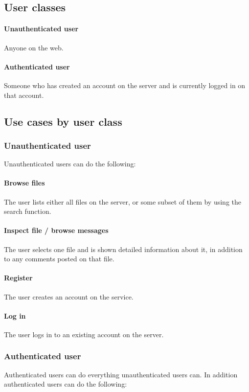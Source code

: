 \documentclass[10pt,a4paper]{article}
\begin{document}
\subsection{User classes}
\paragraph{Unauthenticated user}
Anyone on the web.

\paragraph{Authenticated user}
Someone who has created an account on the server and is currently logged in on that account.

\subsection{Use cases by user class}
\subsubsection{Unauthenticated user}
Unauthenticated users can do the following:
\paragraph{Browse files}
The user lists either all files on the server, or some subset of them by using the search function.
\paragraph{Inspect file / browse messages}
The user selects one file and is shown detailed information about it, in addition to any comments posted on that file.
\paragraph{Register}
The user creates an account on the service.
\paragraph{Log in}
The user logs in to an existing account on the server.


\subsubsection{Authenticated user}
Authenticated users can do everything unauthenticated users can. In addition authenticated users can do the following:
\end{document}
